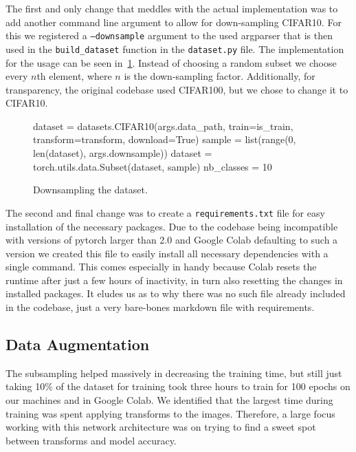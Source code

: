 \documentclass{article}
\begin{document}
    The first and only change that meddles with the actual implementation was to add another command line argument to allow for down-sampling CIFAR10.
    For this we registered a \texttt{--downsample} argument to the used argparser that is then used in the \verb|build_dataset| function in the \texttt{dataset.py} file.
    The implementation for the usage can be seen in~\ref{fig:downsampling}.
    Instead of choosing a random subset we choose every $n$th element, where $n$ is the down-sampling factor.
    Additionally, for transparency, the original codebase used CIFAR100, but we chose to change it to CIFAR10.
    \begin{figure}[h]
        \begin{python}
dataset = datasets.CIFAR10(args.data_path, train=is_train,
                            transform=transform, download=True)
sample = list(range(0, len(dataset), args.downsample))
dataset = torch.utils.data.Subset(dataset, sample)
nb_classes = 10
        \end{python}
        \caption{Downsampling the dataset.}
        \label{fig:downsampling}
    \end{figure}

    The second and final change was to create a \texttt{requirements.txt} file for easy installation of the necessary packages.
    Due to the codebase being incompatible with versions of pytorch larger than 2.0 and Google Colab defaulting to such a version we created this file to easily install all necessary dependencies with a single command.
    This comes especially in handy because Colab resets the runtime after just a few hours of inactivity, in turn also resetting the changes in installed packages.
    It eludes us as to why there was no such file already included in the codebase, just a very bare-bones markdown file with requirements.

    \subsection{Data Augmentation}\label{subsec:data-augmentation}
    The subsampling helped massively in decreasing the training time, but still just taking 10\% of the dataset for training took three hours to train for 100 epochs on our machines and in Google Colab.
    We identified that the largest time during training was spent applying transforms to the images.
    Therefore, a large focus working with this network architecture was on trying to find a sweet spot between transforms and model accuracy.
\end{document}
